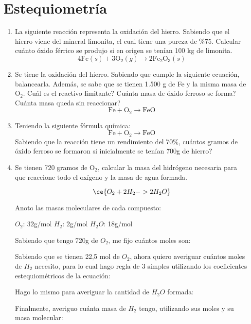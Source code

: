 \section{Estequiometría}

\begin{enumerate}
\item La siguiente reacción representa la oxidación del hierro.
Sabiendo que el hierro viene del mineral limonita, el
cual tiene una pureza de \%75. Calcular cuánto óxido férrico
se produjo si en origen se tenían 100 kg de limonita.
$$4\text{Fe} (s) + 3\text{O}_2 (g) \rightarrow 2\text{Fe}_2\text{O}_3 (s)$$

\item Se tiene la oxidación del hierro. Sabiendo que cumple la siguiente ecuación, balancearla. Además, se sabe que se tienen 1.500 g de Fe y la misma masa de O$_2$. Cuál es el reactivo limitante? Cuánta masa de óxido ferroso se forma? Cuánta masa queda sin reaccionar?
$$\text{Fe} + \text{O}_2 \rightarrow \text{Fe}\text{O}$$

\item Teniendo la siguiente fórmula química:
$$\text{Fe} + \text{O}_2 \rightarrow \text{Fe}\text{O}$$
Sabiendo que la reacción tiene un rendimiento del 70\%, cuántos gramos de óxido ferroso se formaron si inicialmente se tenían 700g de hierro?


\item Se tienen 720 gramos de O$_2$, calcular la masa del hidrógeno
necesaria para que reaccione todo el oxígeno y la masa de 
agua formada.

$$\ce{O_2 + 2H_2 -> 2H_2O}$$

Anoto las masas moleculares de cada compuesto:

\hfil$O_2$: 32g/mol\hfil
$H_2$: 2g/mol\hfil
$H_2O$: 18g/mol\hfil

\skipline
Sabiendo que tengo 720g de $O_2$, me fijo cuántos moles son:

Sabiendo que se tienen 22,5 mol de $O_2$, ahora quiero averiguar cuántos moles de $H_2$ necesito, para lo cual hago regla de 3 simples utilizando los coeficientes estequiométricos de la ecuación:

Hago lo mismo para averiguar la cantidad de $H_2O$ formada:

Finalmente, averiguo cuánta masa de $H_2$ tengo, utilizando sus moles y su masa molecular:


\end{enumerate}
